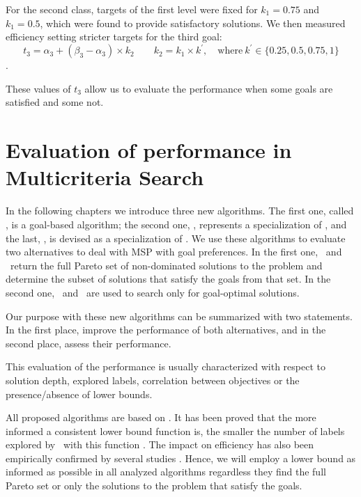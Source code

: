 For the second class, targets of the first level were fixed for $k_1=0.75$ and $k_1=0.5$, which were found to provide satisfactory solutions. We then measured efficiency setting stricter targets for the third goal:
\begin{equation} \label{eq:targets2}
t_3 = \alpha_3 + (\beta_3 - \alpha_3) \times k_2 \qquad k_2 = k_1 \times k^\prime, \quad \textrm{where} \ k^\prime \in \{ 0.25, 0.5, 0.75, 1 \}  
\end{equation}. 

These values of $t_3$ allow us to evaluate the performance when some goals are satisfied and some not. 

\section{Evaluation of performance in Multicriteria Search}
\label{chapMultiObjTestBeds:sec:Performance}

In the following chapters we introduce three new algorithms. The first one, called \lexgo, is a goal-based algorithm; the second one, \namoate, represents a specialization of \namoa, and the last, \lexgote, is devised as a specialization of \lexgo. We use these algorithms to evaluate two alternatives to deal with MSP with goal preferences. In the first one, \namoa \ and \namoate \ return the full Pareto set of non-dominated solutions to the problem and determine the subset of solutions that satisfy the goals from that set. In the second one, \lexgo \ and \lexgote \ are used to search only for goal-optimal solutions. 

Our purpose with these new algorithms can be summarized with two statements. In the first place, improve the performance of both alternatives, and in the second place, assess their performance.

This evaluation of the performance is usually characterized with respect to solution depth, explored labels, correlation between objectives \citep{Brumbaugh-Smith1989,Mote1991,Machuca2010} or the presence/absence of lower bounds.

All proposed algorithms are based on \namoa.
It has been proved that the more informed a consistent lower bound function is, the smaller the number of labels explored by \namoa \ with this function \citep{Mandow2010}. The impact on efficiency has also been empirically confirmed by several studies \citep{Machuca2012, Machuca2012a}. Hence, we will employ a lower bound as informed as possible in all analyzed algorithms regardless they find the full Pareto set or only the solutions to the problem that satisfy the goals. 

